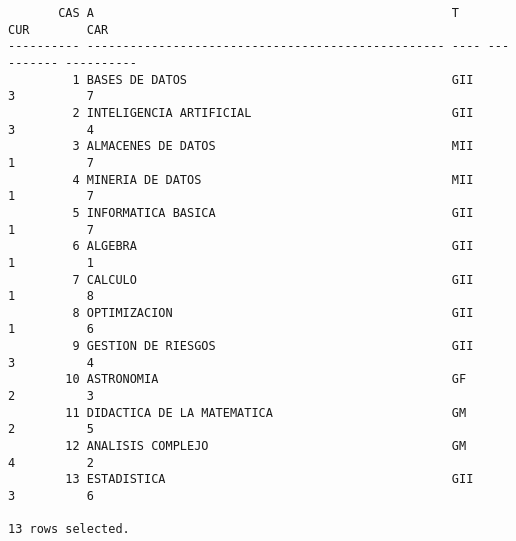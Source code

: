 \documentclass[11pt]{report}
\begin{document}
  \begin{verbatim}
       CAS A                                                  T           CUR        CAR                                                                                                                
---------- -------------------------------------------------- ---- ---------- ----------                                                                                                                
         1 BASES DE DATOS                                     GII           3          7                                                                                                                
         2 INTELIGENCIA ARTIFICIAL                            GII           3          4                                                                                                                
         3 ALMACENES DE DATOS                                 MII           1          7                                                                                                                
         4 MINERIA DE DATOS                                   MII           1          7                                                                                                                
         5 INFORMATICA BASICA                                 GII           1          7                                                                                                                
         6 ALGEBRA                                            GII           1          1                                                                                                                
         7 CALCULO                                            GII           1          8                                                                                                                
         8 OPTIMIZACION                                       GII           1          6                                                                                                                
         9 GESTION DE RIESGOS                                 GII           3          4                                                                                                                
        10 ASTRONOMIA                                         GF            2          3                                                                                                                
        11 DIDACTICA DE LA MATEMATICA                         GM            2          5                                                                                                                
        12 ANALISIS COMPLEJO                                  GM            4          2                                                                                                                
        13 ESTADISTICA                                        GII           3          6                                                                                                                

13 rows selected.
  \end{verbatim}
\end{document}
